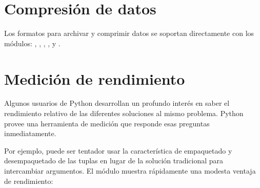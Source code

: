 \documentclass[a4,10pt,spanish]{sphinxmanual}
\begin{document}
\section{Compresión de datos}
\label{\detokenize{tutorial/stdlib:data-compression}}\label{\detokenize{tutorial/stdlib:tut-data-compression}}
\sphinxAtStartPar
Los formatos para archivar y comprimir datos se soportan directamente con los módulos: , , , ,  y .

\begin{sphinxVerbatim}[commandchars=\\\{\}]
 
  
  
\end{sphinxVerbatim}


\section{Medición de rendimiento}
\label{\detokenize{tutorial/stdlib:performance-measurement}}\label{\detokenize{tutorial/stdlib:tut-performance-measurement}}
\sphinxAtStartPar
Algunos usuarios de Python desarrollan un profundo interés en saber el rendimiento relativo de las diferentes soluciones al mismo problema.  Python provee una herramienta de medición que responde esas preguntas inmediatamente.

\sphinxAtStartPar
Por ejemplo, puede ser tentador usar la característica de empaquetado y desempaquetado de las tuplas en lugar de la solución tradicional para intercambiar argumentos.  El módulo  muestra rápidamente una modesta ventaja de rendimiento:
\end{document}
